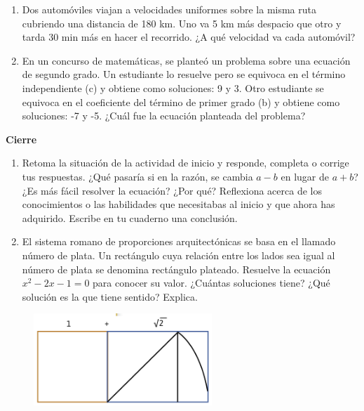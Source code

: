 \documentclass[11pt]{book}
\begin{document}
\begin{enumerate}
  \item Dos automóviles viajan a velocidades uniformes sobre la misma ruta cubriendo una distancia de 180 km. Uno va 5 km más despacio que otro y tarda 30 min más en hacer el recorrido. ¿A qué velocidad va cada automóvil?

  \item En un concurso de matemáticas, se planteó un problema sobre una ecuación de segundo grado. Un estudiante lo resuelve pero se equivoca en el término independiente (c) y obtiene como soluciones: 9 y 3. Otro estudiante se equivoca en el coeficiente del término de primer grado (b) y obtiene como soluciones: -7 y -5. ¿Cuál fue la ecuación planteada del problema?


\end{enumerate}

\begin{boxK}
  \begin{center}\textbf{Cierre}\end{center}

  \begin{enumerate}
    \item Retoma la situación de la actividad de inicio y responde, completa o corrige tus respuestas. ¿Qué pasaría si en la razón, se cambia $a - b$ en lugar de $a + b$?
          ¿Es más fácil resolver la ecuación? ¿Por qué?
          Reflexiona acerca de los conocimientos o las habilidades que necesitabas al inicio y que ahora has adquirido. Escribe en tu cuaderno una conclusión.
    \item El sistema romano de proporciones arquitectónicas se basa
          en el llamado número de plata. Un rectángulo cuya relación entre los lados sea igual al número de plata se denomina
          rectángulo plateado. Resuelve la ecuación $x^2 - 2x - 1 = 0$ para conocer su valor. ¿Cuántas soluciones tiene? ¿Qué solución es la que tiene sentido? Explica.
  \end{enumerate}

  \begin{figure}[H]
    \centering
    \includegraphics[width=0.6\textwidth]{plata.png}
    \label{fig:plata}
  \end{figure}

\end{boxK}
\end{document}
